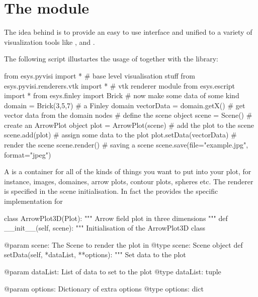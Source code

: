\chapter{The module \pyvisi}
                                                                                                                                                                                                     

The idea behind is to provide an easy to use interface and unified to a variety of
visualization tools like \VTK, \OpenDX and \GnuPlot.

The following script illustartes the usage of \pyvisi together with the 
\VTK library:
\begin{python}
from esys.pyvisi import *                # base level visualisation stuff
from esys.pyvisi.renderers.vtk import *  # vtk renderer module
from esys.escript import *
from esys.finley import Brick
# now make some data of some kind
domain = Brick(3,5,7)  # a Finley domain
vectorData = domain.getX()  # get vector data from the domain nodes
# define the scene object
scene = Scene()
# create an ArrowPlot object
plot = ArrowPlot(scene)
# add the plot to the scene
scene.add(plot)
# assign some data to the plot
plot.setData(vectorData)
# render the scene
scene.render()
# saving a scene
scene.save(file="example.jpg", format="jpeg")
\begin{python}
A \Scene is a container for all of the kinds of things you want to put into your plot,
for instance, images, domaines, arrow plots, contour plots, spheres etc.
The renderer is specified in the scene initialisation. In fact the 
 provides the specific implementation for 
\VTK


\begin{verbose}
class ArrowPlot3D(Plot):
    """
    Arrow field plot in three dimensions
    """
    def __init__(self, scene):
        """
        Initialisation of the ArrowPlot3D class
        
        @param scene: The Scene to render the plot in
        @type scene: Scene object
    def setData(self, *dataList, **options):
        """
        Set data to the plot

        @param dataList: List of data to set to the plot
        @type dataList: tuple

        @param options: Dictionary of extra options
        @type options: dict


\end{verbose}
\end{python}
\end{python}
